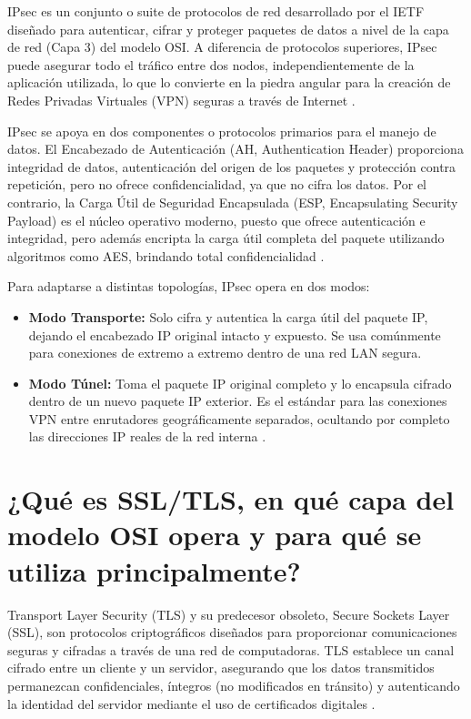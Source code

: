 \documentclass[a4paper,12pt]{article}
\begin{document}
IPsec es un conjunto o suite de protocolos de red desarrollado por el IETF diseñado para autenticar, cifrar y proteger paquetes de datos a nivel de la capa de red (Capa 3) del modelo OSI. A diferencia de protocolos superiores, IPsec puede asegurar todo el tráfico entre dos nodos, independientemente de la aplicación utilizada, lo que lo convierte en la piedra angular para la creación de Redes Privadas Virtuales (VPN) seguras a través de Internet \cite{cisco2021}.

IPsec se apoya en dos componentes o protocolos primarios para el manejo de datos. El Encabezado de Autenticación (AH, Authentication Header) proporciona integridad de datos, autenticación del origen de los paquetes y protección contra repetición, pero no ofrece confidencialidad, ya que no cifra los datos. Por el contrario, la Carga Útil de Seguridad Encapsulada (ESP, Encapsulating Security Payload) es el núcleo operativo moderno, puesto que ofrece autenticación e integridad, pero además encripta la carga útil completa del paquete utilizando algoritmos como AES, brindando total confidencialidad \cite{stallings2017}.

Para adaptarse a distintas topologías, IPsec opera en dos modos:
\begin{itemize}
    \item \textbf{Modo Transporte:} Solo cifra y autentica la carga útil del paquete IP, dejando el encabezado IP original intacto y expuesto. Se usa comúnmente para conexiones de extremo a extremo dentro de una red LAN segura.
    \item \textbf{Modo Túnel:} Toma el paquete IP original completo y lo encapsula cifrado dentro de un nuevo paquete IP exterior. Es el estándar para las conexiones VPN entre enrutadores geográficamente separados, ocultando por completo las direcciones IP reales de la red interna \cite{ibm2023}.
\end{itemize}

\section{¿Qué es SSL/TLS, en qué capa del modelo OSI opera y para qué se utiliza principalmente?}

Transport Layer Security (TLS) y su predecesor obsoleto, Secure Sockets Layer (SSL), son protocolos criptográficos diseñados para proporcionar comunicaciones seguras y cifradas a través de una red de computadoras. TLS establece un canal cifrado entre un cliente y un servidor, asegurando que los datos transmitidos permanezcan confidenciales, íntegros (no modificados en tránsito) y autenticando la identidad del servidor mediante el uso de certificados digitales \cite{kurose2017}.
\end{document}
